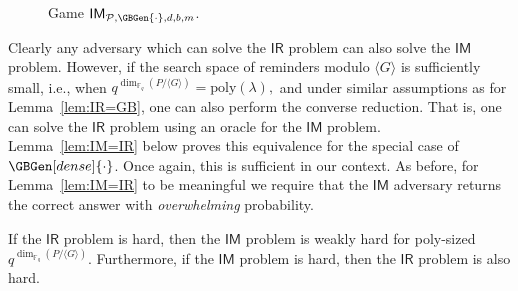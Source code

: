 \documentclass[draft]{llncs}
\newcommand{\ring}[1]{\mathbb{#1}}
\newcommand{\F}{\ensuremath{\ring{F}}\xspace}
\newcommand{\ideal}[1]{\ensuremath{\langle #1 \rangle}\xspace}
\newcommand{\IR}{\ensuremath{\mathsf{IR}}\xspace}
\newcommand{\IM}{\ensuremath{\mathsf{IM}}\xspace}
\newcommand{\secpar}{\lambda}
\newcommand{\Finalize}{\mathbf{Finalize}}
\newcommand{\sample}{{\;{{\leftarrow}_\$}\;}}
\newcommand{\px}{\phantom{i}}
\begin{document}
\begin{definition}
\begin{figure}[ht]
{
}
\caption{Game $\IM_{\mathcal{P},\GBGen{\cdot},d,b,m}$.}
\label{fig.im}
\vspace{-6mm} \end{figure}
\end{definition}
Clearly any adversary which can solve the \IR problem can also solve the \IM problem. However, if the search space of reminders modulo $\ideal{G}$ is sufficiently small, i.e., when $q^{\dim_{\F_q}(P/\ideal{G})}=\mathrm{poly}(\secpar),$ and under similar assumptions as for Lemma~\ref{lem:IR=GB}, one can also perform the converse reduction. That is, one can solve the \IR problem using an oracle for the \IM problem. Lemma~\ref{lem:IM=IR} below proves this equivalence for the special case of $\GBGen[dense]{\cdot}$. Once again, this is sufficient in our context. As before, for Lemma~\ref{lem:IM=IR} to be meaningful we require that the \IM adversary returns the correct answer with {\em overwhelming} probability.

\begin{lemma}
\label{lem:IM=IR}
If the \IR problem is hard, then the \IM problem is weakly hard for poly-sized $q^{\dim_{\F_q}(P/\ideal{G})}$. 
Furthermore, if the \IM problem is hard, then the \IR problem is also hard.
\end{lemma}
\end{document}
